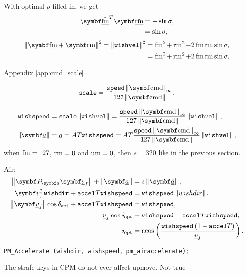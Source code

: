 With optimal $\rho$ filled in, we get
\begin{align*}
\uvec{\flat{\fmove}}^T \uvec{\flat{\rmove}} &= -\sin\sigma,\\
&= \sin\sigma,
\end{align*}
\begin{align*}
\norm{\vec{\flat{\fmove}} + \vec{\flat{\rmove}}}^2 = \norm{\texttt{wishvel}}^2 &= \fmove^2 + \rmove^2 - 2\fmove\rmove\sin\sigma,\\
&= \fmove^2 + \rmove^2 + 2\fmove\rmove\sin\sigma,
\end{align*}

Appendix \ref{app:cmd_scale}

\begin{align*}
\texttt{scale} = \frac{\texttt{speed}\norm{\vec{\cmd}}_{\infty}}{127\norm{\vec{\cmd}}},
\end{align*}

\begin{align*}
\texttt{wishspeed} &= \texttt{scale} \norm{\texttt{wishvel}} =
\frac{\texttt{speed}\norm{\vec{\cmd}}_{\infty}}{127\norm{\vec{\cmd}}} \norm{\texttt{wishvel}},\\
\norm{\vec{\flat{a}}} &= \flat{a} = AT \texttt{wishspeed} = AT\frac{\texttt{speed}\norm{\vec{\cmd}}_{\infty}}{127\norm{\vec{\cmd}}} \norm{\texttt{wishvel}},
\end{align*}
when $\operatorname{fm} = 127$, $\operatorname{rm} = 0$ and $\operatorname{um} = 0$, then $s = 320$ like in the previous section.

Air:
\begin{align}
\nonumber
\norm{\projmat{a} \vec{\flat{v}}_f} + \norm{\vec{\flat{a}}} &= s \norm{\uvec{\flat{a}}},\\
\nonumber
\vec{v}_{f}^T\texttt{wishdir} + \texttt{accel}T\texttt{wishspeed} &= \texttt{wishspeed}\norm{wishdir},\\
\nonumber
\norm{\vec{\flat{v}}_f} \cos{\delta_{\opt}} + \texttt{accel}T\texttt{wishspeed} &= \texttt{wishspeed},\\
\nonumber
\flat{v}_f \cos{\delta_{\opt}} &= \texttt{wishspeed} - \texttt{accel}T\texttt{wishspeed},\\
\delta_{\opt} &= \acos\left( \frac{\texttt{wishspeed} \left(1 - \texttt{accel}T\right)}{\flat{v}_f} \right).
\end{align}

\texttt{PM\_Accelerate (wishdir, wishspeed, pm\_airaccelerate);}

The strafe keys in CPM do not ever affect upmove. Not true


